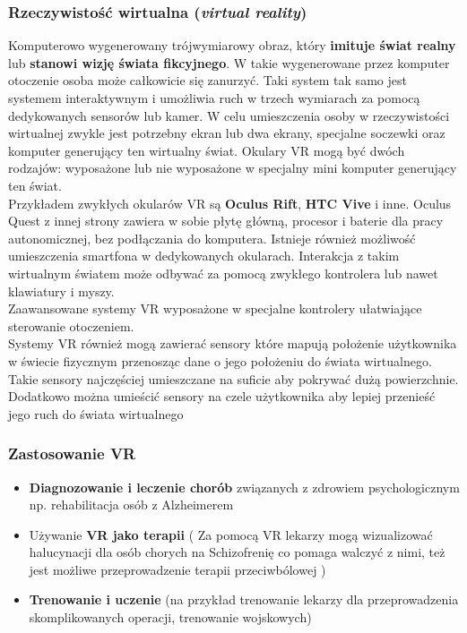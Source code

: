 \subsubsection{Rzeczywistość wirtualna (\textit{virtual reality})}

Komputerowo wygenerowany trójwymiarowy obraz, który \textbf{imituje świat realny} lub\textbf{ stanowi wizję świata fikcyjnego}. W takie wygenerowane przez komputer otoczenie osoba może całkowicie się zanurzyć. Taki system tak samo jest systemem interaktywnym i umożliwia ruch w trzech wymiarach za pomocą dedykowanych sensorów lub kamer. W celu umieszczenia osoby w rzeczywistości wirtualnej zwykle jest potrzebny ekran lub dwa ekrany, specjalne soczewki oraz komputer generujący ten wirtualny świat. Okulary VR mogą być dwóch rodzajów: wyposażone lub nie wyposażone w specjalny mini komputer generujący ten świat. \\

Przykładem zwykłych okularów VR są \textbf{Oculus Rift}, \textbf{HTC Vive} i inne. Oculus Quest z innej strony zawiera w sobie płytę główną, procesor i baterie dla pracy autonomicznej, bez podłączania do komputera. Istnieje również możliwość umieszczenia smartfona w dedykowanych okularach. Interakcja z takim wirtualnym światem może odbywać za pomocą zwykłego kontrolera lub nawet klawiatury i myszy. \\

Zaawansowane systemy VR wyposażone w specjalne kontrolery ułatwiające sterowanie otoczeniem. \\

Systemy VR również mogą zawierać sensory które mapują położenie użytkownika w świecie fizycznym przenosząc dane o jego położeniu do świata wirtualnego. Takie sensory najczęściej umieszczane na suficie aby pokrywać dużą powierzchnie. Dodatkowo można umieścić sensory na czele użytkownika aby lepiej przenieść jego ruch do świata wirtualnego 

\subsubsection{Zastosowanie VR}

\begin{itemize}
	\item \textbf{Diagnozowanie i leczenie chorób} związanych z zdrowiem psychologicznym np. rehabilitacja osób z Alzheimerem
	\item Używanie \textbf{VR jako terapii} ( Za pomocą VR lekarzy mogą wizualizować halucynacji dla osób chorych na Schizofrenię co pomaga walczyć z nimi, też jest możliwe przeprowadzenie terapii przeciwbólowej ) 
	\item \textbf{Trenowanie i uczenie} (na przykład trenowanie lekarzy dla przeprowadzenia skomplikowanych operacji, trenowanie wojskowych)
\end{itemize}
